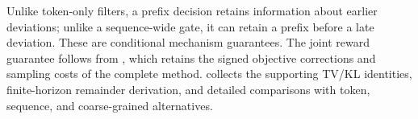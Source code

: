 Unlike token-only filters, a prefix decision retains information about
earlier deviations; unlike a sequence-wide gate, it can retain a prefix
before a late deviation. These are conditional mechanism guarantees.
The joint reward guarantee follows from ,
which retains the signed objective corrections and sampling costs of the
complete method.  collects the supporting TV/KL
identities, finite-horizon remainder derivation, and detailed comparisons
with token, sequence, and coarse-grained alternatives.
